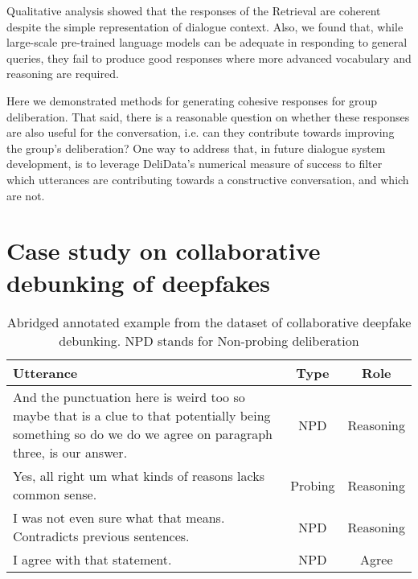 \documentclass[acmsmall,manuscript,screen]{acmart}
\begin{document}
Qualitative analysis showed that the responses of the Retrieval are coherent despite the simple representation of dialogue context. Also, we found that, while large-scale pre-trained language models can be adequate in responding to general queries, they fail to produce good responses where more advanced vocabulary and reasoning are required.

Here we demonstrated methods for generating cohesive responses for group deliberation. That said, there is a reasonable question on whether these responses are also useful for the conversation, i.e. can they contribute towards improving the group's deliberation? One way to address that, in future dialogue system development, is to leverage DeliData's numerical measure of success to filter which utterances are contributing towards a constructive conversation, and which are not.


















\section{Case study on collaborative debunking of deepfakes}
\label{sec:deepfake}

\begin{table}[]
    \centering
    \begin{tabular}{l|c|c}
    \textbf{Utterance} & \textbf{Type} & \textbf{Role} \\ \hline
    \multicolumn{1}{p{10cm}|}{And the punctuation here is weird too so maybe that is a clue to that potentially being something so do we do we agree on paragraph three, is our answer.}  & NPD & Reasoning \\ \hline
    Yes, all right um what kinds of reasons lacks common sense. & Probing & Reasoning \\ \hline
    I was not even sure what that means. Contradicts previous sentences. & NPD & Reasoning \\ \hline
    I agree with that statement. & NPD & Agree \\ \hline
    \end{tabular}
    \caption{Abridged annotated example from the dataset of collaborative deepfake debunking. NPD stands for Non-probing deliberation}
    \label{tab:deepfkate}
\end{table}
\end{document}
